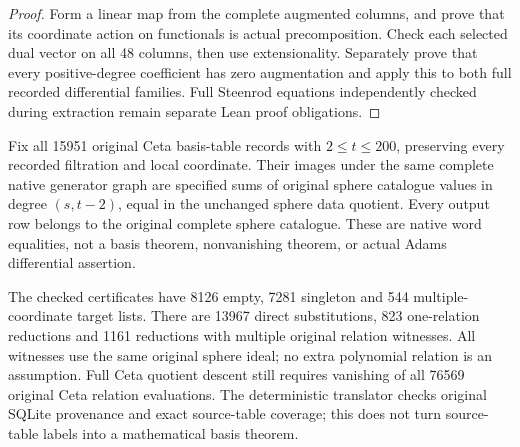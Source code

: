 \begin{proof}
  \leanok
  Form a linear map from the complete augmented columns, and prove that
  its coordinate action on functionals is actual precomposition. Check
  each selected dual vector on all 48 columns, then use extensionality.
  Separately prove that every positive-degree coefficient has zero
  augmentation and apply this to both full recorded differential families.
  Full Steenrod equations independently checked during extraction remain
  separate Lean proof obligations.
\end{proof}

\begin{lemma}
  \label{lem:lin-naturality-words200}
  \leanok
  Fix all 15951 original Ceta basis-table records with $2\le t\le200$,
  preserving every recorded filtration and local coordinate. Their images
  under the same complete native generator graph are specified sums of
  original sphere catalogue values in degree $(s,t-2)$, equal in the
  unchanged sphere data quotient. Every output row belongs to the original
  complete sphere catalogue. These are native word equalities, not a basis
  theorem, nonvanishing theorem, or actual Adams differential assertion.

  The checked certificates have 8126 empty, 7281 singleton and 544
  multiple-coordinate target lists. There are 13967 direct substitutions,
  823 one-relation reductions and 1161 reductions with multiple original
  relation witnesses. All witnesses use the same original sphere ideal;
  no extra polynomial relation is an assumption. Full Ceta quotient descent
  still requires vanishing of all 76569 original Ceta relation evaluations.
  The deterministic translator checks original SQLite provenance and exact
  source-table coverage; this does not turn source-table labels into a
  mathematical basis theorem.
\end{lemma}
